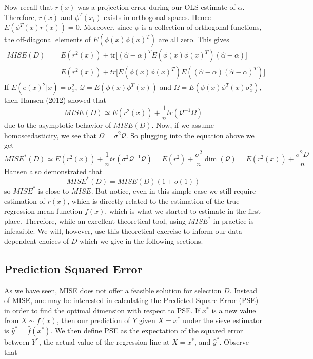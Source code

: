 \documentclass[12pt]{article}  %
\begin{document}
Now recall that $r(x)$ was a projection error during our OLS estimate of $\alpha$. Therefore, $r(x)$ and $\phi^{T}(x_i)$ exists in orthogonal spaces. Hence $E(\phi^{T}(x)r(x)) = 0$. Moreover, since $\phi$ is a collection of orthogonal functions, the off-diagonal elements of $E(\phi(x)\phi(x)^T)$ are all zero. This gives 
\begin{align*}
MISE(D) &= E(r^{2}(x)) + \text{tr}\Big[(\hat{\alpha} - \alpha)^TE(\phi(x)\phi(x)^T)(\hat{\alpha} - \alpha)\Big]\\
&= E(r^{2}(x)) + tr\Big[E(\phi(x)\phi(x)^{T})E\left((\hat{\alpha} - \alpha)(\hat{\alpha} - \alpha)^{T}\right)\Big]
\end{align*}
If $E(e(x)^2|x) = \sigma_x^2$, $\mathcal{Q} = E(\phi(x)\phi^T(x))$ and $\Omega = E(\phi(x)\phi^T(x)\sigma_x^2)$, then Hansen (2012) showed that 
$$MISE(D)\simeq E(r^2(x)) + \frac{1}{n}tr\left(\mathcal{Q}^{-1}\Omega\right)$$
due to the asymptotic behavior of $MISE(D)$. Now, if we assume homoscedasticity, we see that $\Omega = \sigma^2\mathcal{Q}$. So plugging into the equation above we get
$$MISE^*(D)\simeq E(r^2(x)) + \frac{1}{n}tr\left(\sigma^2\mathcal{Q}^{-1}\mathcal{Q}\right) = E(r^2) + \frac{\sigma^2}{n}\dim(\mathcal{Q}) = E(r^2(x)) + \frac{\sigma^2 D}{n}$$
Hansen also demonstrated that $$MISE^*(D) = MISE(D)(1 + o(1))$$ so $MISE^*$ is close to $MISE$. But notice, even in this simple case we still require estimation of $r(x)$, which is directly related to the estimation of the true regression mean function $f(x)$, which is what we started to estimate in the first place. Therefore, while an excellent theoretical tool, using $MISE^*$ in practice is infeasible. We will, however, use this theoretical exercise to inform our data dependent choices of $D$ which we give in the following sections.

\subsection{Prediction Squared Error}

As we have seen, MISE does not offer a feasible solution for selection $D$. Instead of MISE, one may be interested in calculating the Predicted Square Error (PSE) in order to find the optimal dimension with respect to PSE. If $x^*$  is a new value from $X \sim f(x)$, then our prediction of $Y$ given $X = x^*$ under the sieve estimator is $\hat{y}^* = \hat{f}(x^*)$. We then define PSE as the expectation of the squared error between $Y^*$, the actual value of the regression line at $X=x^*$, and $\hat{y}^*$. Observe that
\end{document}
